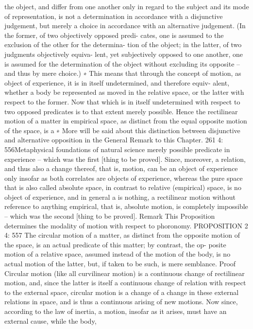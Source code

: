 the object, and differ from one another only in regard to the subject
and its mode of representation, is not a determination in accordance
with a disjunctive judgement, but merely a choice in accordance with an
alternative judgement. (In the former, of two objectively opposed predi-
cates, one is assumed to the exclusion of the other for the determina-
tion of the object; in the latter, of two judgments objectively equiva-
lent, yet subjectively opposed to one another, one is assumed for the
determination of the object without excluding its opposite – and thus
by mere choice.) ∗ This means that through the concept of motion, as
object of experience, it is in itself undetermined, and therefore equiv-
alent, whether a body be represented as moved in the relative space,
or the latter with respect to the former. Now that which is in itself
undetermined with respect to two opposed predicates is to that extent
merely possible. Hence the rectilinear motion of a matter in empirical
space, as distinct from the equal opposite motion of the space, is a
∗
More will be said about this distinction between disjunctive and alternative
opposition in the General Remark to this Chapter.
261
4: 556Metaphysical foundations of natural science
merely possible predicate in experience – which was the ﬁrst [thing to
be proved].
Since, moreover, a relation, and thus also a change thereof, that is,
motion, can be an object of experience only insofar as both correlates are
objects of experience, whereas the pure space that is also called absolute
space, in contrast to relative (empirical) space, is no object of experience,
and in general a is nothing, a rectilinear motion without reference to
anything empirical, that is, absolute motion, is completely impossible –
which was the second [thing to be proved].
Remark
This Proposition determines the modality of motion with respect to
phoronomy.
PROPOSITION 2
4: 557
The circular motion of a matter, as distinct from the opposite motion
of the space, is an actual predicate of this matter; by contrast, the op-
posite motion of a relative space, assumed instead of the motion of the
body, is no actual motion of the latter, but, if taken to be such, is mere
semblance.
Proof
Circular motion (like all curvilinear motion) is a continuous change of
rectilinear motion, and, since the latter is itself a continuous change of
relation with respect to the external space, circular motion is a change
of a change in these external relations in space, and is thus a continuous
arising of new motions. Now since, according to the law of inertia, a
motion, insofar as it arises, must have an external cause, while the body,

